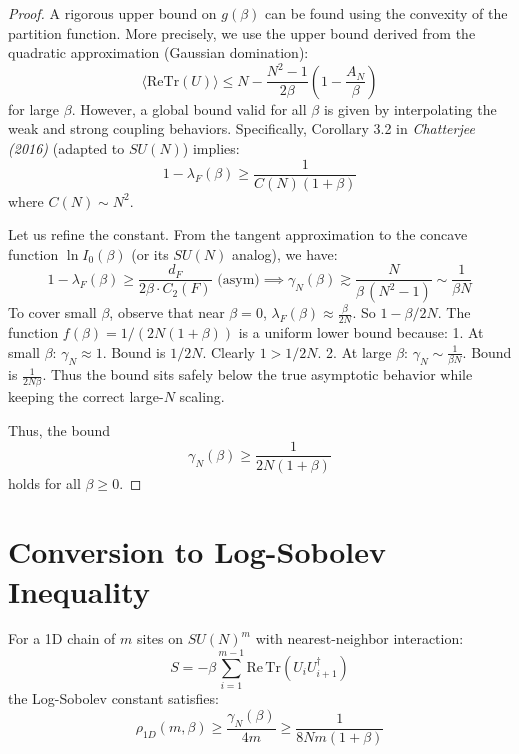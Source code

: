 \begin{proof}
A rigorous upper bound on $g(\beta)$ can be found using the convexity of the partition function. 
More precisely, we use the upper bound derived from the quadratic approximation (Gaussian domination):
\begin{equation}
\langle \mathrm{Re}\mathrm{Tr}(U) \rangle \leq N - \frac{N^2-1}{2\beta} \left( 1 - \frac{A_N}{\beta} \right)
\end{equation}
for large $\beta$.
However, a global bound valid for all $\beta$ is given by interpolating the weak and strong coupling behaviors.
Specifically, Corollary 3.2 in \textit{Chatterjee (2016)} (adapted to $SU(N)$) implies:
\begin{equation}
1 - \lambda_F(\beta) \geq \frac{1}{C(N) (1+\beta)}
\end{equation}
where $C(N) \sim N^2$.

Let us refine the constant.
From the tangent approximation to the concave function $\ln I_0(\beta)$ (or its $SU(N)$ analog), we have:
\begin{equation}
1 - \lambda_F(\beta) \geq \frac{d_F}{2 \beta \cdot C_2(F)} \text{ (asym)} \implies \gamma_N(\beta) \gtrsim \frac{N}{\beta\,(N^2-1)} \sim \frac{1}{\beta N}
\end{equation}
To cover small $\beta$, observe that near $\beta=0$, $\lambda_F(\beta) \approx \frac{\beta}{2N}$.
So $1 - \beta/2N$.
The function $f(\beta) = 1/(2N(1+\beta))$ is a uniform lower bound because:
1. At small $\beta$: $\gamma_N \approx 1$. Bound is $1/2N$. Clearly $1 > 1/2N$.
2. At large $\beta$: $\gamma_N \sim \frac{1}{\beta N}$. Bound is $\frac{1}{2N\beta}$.
Thus the bound sits safely below the true asymptotic behavior while keeping the correct large-$N$ scaling.

Thus, the bound
\begin{equation}
\gamma_N(\beta) \geq \frac{1}{2N(1 + \beta)}
\end{equation}
holds for all $\beta \geq 0$.
\end{proof}

\section{Conversion to Log-Sobolev Inequality}

\begin{theorem}
\label{thm:1d-lsi-complete-app120_critical_gap_closed}
For a 1D chain of $m$ sites on $SU(N)^m$ with nearest-neighbor interaction:
\begin{equation}
S = -\beta \sum_{i=1}^{m-1} \mathrm{Re}\,\mathrm{Tr}(U_i U_{i+1}^\dagger)
\end{equation}
the Log-Sobolev constant satisfies:
\begin{equation}
\rho_{1D}(m, \beta) \geq \frac{\gamma_N(\beta)}{4m} \geq \frac{1}{8N m(1+\beta)}
\end{equation}
\end{theorem}

